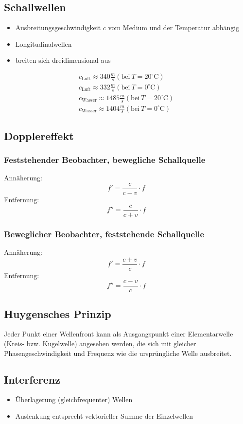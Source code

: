 \documentclass[12pt,a4paper,titlepage]{article}
\begin{document}
		\subsection{Schallwellen}
			\begin{itemize}
				\item Ausbreitungsgeschwindigkeit $c$ vom Medium und der Temperatur abhängig
				\item Longitudinalwellen
				\item breiten sich dreidimensional aus
			\end{itemize}
			\begin{gather*}
				c_{\mathrm{Luft}} \approx 340 \frac{m}{s} (\mathrm{bei}\ T = 20^{\circ}\mathrm{C})\\
				c_{\mathrm{Luft}} \approx 332 \frac{m}{s} (\mathrm{bei}\ T = 0^{\circ}\mathrm{C})\\
				c_{\mathrm{Wasser}} \approx 1485 \frac{m}{s} (\mathrm{bei}\ T = 20^{\circ}\mathrm{C})\\
				c_{\mathrm{Wasser}} \approx 1404 \frac{m}{s} (\mathrm{bei}\ T = 0^{\circ}\mathrm{C})
			\end{gather*}
		\subsection{Dopplereffekt}
			\subsubsection{Feststehender Beobachter, bewegliche Schallquelle}
				Annäherung: 
				$$f' = \frac{c}{c-v}\cdot f$$
				Entfernung: 
				$$f'' = \frac{c}{c+v}\cdot f$$
			\subsubsection{Beweglicher Beobachter, feststehende Schallquelle}
				Annäherung: 
				$$f' = \frac{c+v}{c}\cdot f$$
				Entfernung: 
				$$f'' = \frac{c-v}{c}\cdot f$$
		\subsection{Huygensches Prinzip}
			Jeder Punkt einer Wellenfront kann als Ausgangspunkt einer Elementarwelle (Kreis- bzw. Kugelwelle) angesehen werden, die sich mit gleicher Phasengeschwindigkeit und Frequenz wie die ursprüngliche Welle ausbreitet.
		\subsection{Interferenz}
			\begin{itemize}
				\item Überlagerung (gleichfrequenter) Wellen
				\item Auslenkung entsprecht vektorieller Summe der Einzelwellen
			\end{itemize}
\end{document}
